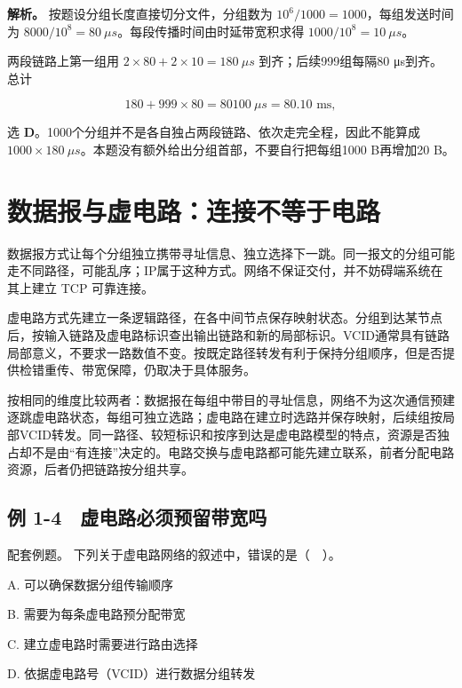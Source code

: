 \textbf{解析。} 按题设分组长度直接切分文件，分组数为 \(10^6/1000=1000\)，每组发送时间为 \(8000/10^8=80\ \mu s\)。每段传播时间由时延带宽积求得 \(1000/10^8=10\ \mu s\)。

两段链路上第一组用 \(2\times80+2\times10=180\ \mu s\) 到齐；后续999组每隔80 μs到齐。总计

\[180+999\times80=80100\ \mu s=80.10\text{ ms},\]

选 \textbf{D}。1000个分组并不是各自独占两段链路、依次走完全程，因此不能算成 \(1000\times180\ \mu s\)。本题没有额外给出分组首部，不要自行把每组1000 B再增加20 B。

\section{数据报与虚电路：连接不等于电路}\label{CN01-08}

数据报方式让每个分组独立携带寻址信息、独立选择下一跳。同一报文的分组可能走不同路径，可能乱序；IP属于这种方式。网络不保证交付，并不妨碍端系统在其上建立 TCP 可靠连接。

虚电路方式先建立一条逻辑路径，在各中间节点保存映射状态。分组到达某节点后，按输入链路及虚电路标识查出输出链路和新的局部标识。VCID通常具有链路局部意义，不要求一路数值不变。按既定路径转发有利于保持分组顺序，但是否提供检错重传、带宽保障，仍取决于具体服务。

按相同的维度比较两者：数据报在每组中带目的寻址信息，网络不为这次通信预建逐跳虚电路状态，每组可独立选路；虚电路在建立时选路并保存映射，后续组按局部VCID转发。同一路径、较短标识和按序到达是虚电路模型的特点，资源是否独占却不是由``有连接''决定的。电路交换与虚电路都可能先建立联系，前者分配电路资源，后者仍把链路按分组共享。

\subsection{例 1-4　虚电路必须预留带宽吗}\label{CN01-ex4}

\begin{example}[配套例题]

配套例题。 下列关于虚电路网络的叙述中，错误的是（　）。

A. 可以确保数据分组传输顺序

B. 需要为每条虚电路预分配带宽

C. 建立虚电路时需要进行路由选择

D. 依据虚电路号（VCID）进行数据分组转发

\end{example}

